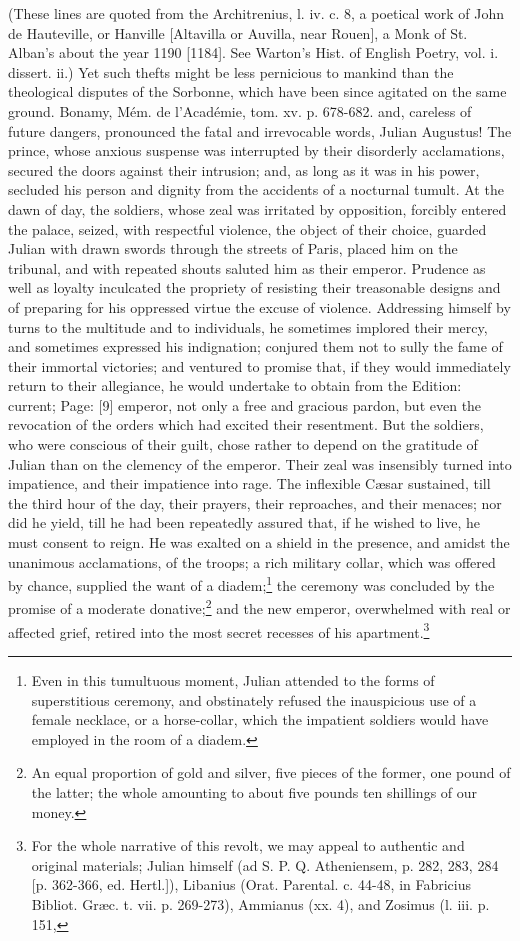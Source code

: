 {(These lines are quoted from the Architrenius, l. iv. c. 8, a poetical work of John de Hauteville, or Hanville [Altavilla or Auvilla, near Rouen], a Monk of St. Alban\texthebrew{}’s about the year 1190 [1184]. See Warton\texthebrew{}’s Hist. of English Poetry, vol. i. dissert. ii.) Yet such thefts might be less pernicious to mankind than the theological disputes of the Sorbonne, which have been since agitated on the same ground. Bonamy, Mém. de l\texthebrew{}’Académie, tom. xv. p. 678-682.} and, careless of future dangers, pronounced the fatal and irrevocable words, Julian Augustus! The prince, whose anxious suspense was interrupted by their disorderly acclamations, secured the doors against their intrusion; and, as long as it was in his power, secluded his person and dignity from the accidents of a nocturnal tumult. At the dawn of day, the soldiers, whose zeal was irritated by opposition, forcibly entered the palace, seized, with respectful violence, the object of their choice, guarded Julian with drawn swords through the streets of Paris, placed him on the tribunal, and with repeated shouts saluted him as their emperor. Prudence as well as loyalty inculcated the propriety of resisting their treasonable designs and of preparing for his oppressed virtue the excuse of violence. Addressing himself by turns to the multitude and to individuals, he sometimes implored their mercy, and sometimes expressed his indignation; conjured them not to sully the fame of their immortal victories; and ventured to promise that, if they would immediately return to their allegiance, he would undertake to obtain from the Edition: current; Page: [9] emperor, not only a free and gracious pardon, but even the revocation of the orders which had excited their resentment. But the soldiers, who were conscious of their guilt, chose rather to depend on the gratitude of Julian than on the clemency of the emperor. Their zeal was insensibly turned into impatience, and their impatience into rage. The inflexible Cæsar sustained, till the third hour of the day, their prayers, their reproaches, and their menaces; nor did he yield, till he had been repeatedly assured that, if he wished to live, he must consent to reign. He was exalted on a shield in the presence, and amidst the unanimous acclamations, of the troops; a rich military collar, which was offered by chance, supplied the want of a diadem;\footnote{Even in this tumultuous moment, Julian attended to the forms of superstitious ceremony, and obstinately refused the inauspicious use of a female necklace, or a horse-collar, which the impatient soldiers would have employed in the room of a diadem.} the ceremony was concluded by the promise of a moderate donative;\footnote{An equal proportion of gold and silver, five pieces of the former, one pound of the latter; the whole amounting to about five pounds ten shillings of our money.} and the new emperor, overwhelmed with real or affected grief, retired into the most secret recesses of his apartment.\footnote{For the whole narrative of this revolt, we may appeal to authentic and original materials; Julian himself (ad S. P. Q. Atheniensem, p. 282, 283, 284 [p. 362-366, ed. Hertl.]), Libanius (Orat. Parental. c. 44-48, in Fabricius Bibliot. Græc. t. vii. p. 269-273), Ammianus (xx. 4), and Zosimus (l. iii. p. 151, }
